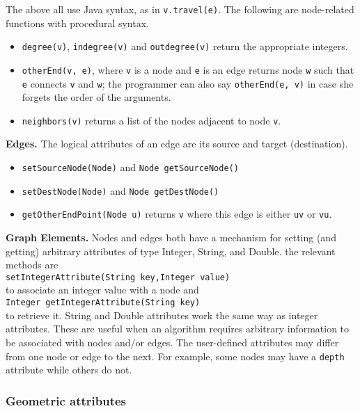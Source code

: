 The above all use Java syntax, as in \texttt{v.travel(e)}.
The following are node-related functions with procedural syntax.

\begin{itemize}
\item \texttt{degree(v)}, \texttt{indegree(v)} and \texttt{outdegree(v)} return the appropriate
integers.
\item \texttt{otherEnd(v, e)}, where \texttt{v} is a node and \texttt{e} is an edge
returns node \texttt{w} such that \texttt{e} connects \texttt{v} and \texttt{w};
the programmer can also say \texttt{otherEnd(e, v)} in case she forgets the order
of the arguments.
\item \texttt{neighbors(v)} returns a list of the nodes adjacent to node \texttt{v}.
\end{itemize}

\bigskip
\textbf{Edges.}
The logical attributes of an edge are its source and target (destination).

\begin{itemize}
\item
\texttt{setSourceNode(Node)} and \texttt{Node~getSourceNode()}
\item
\texttt{setDestNode(Node)} and \texttt{Node~getDestNode()}
\item
\texttt{getOtherEndPoint(Node~u)} returns \texttt{v} where this edge is
either \texttt{uv} or \texttt{vu}.
\end{itemize}

\bigskip
\textbf{Graph Elements.}
Nodes and edges both have a mechanism for setting (and getting)
arbitrary attributes of type Integer, String, and Double.
the relevant methods are\\
\texttt{setIntegerAttribute(String~key,Integer~value)}\\ 
to associate an integer value with a node and\\
\texttt{Integer~getIntegerAttribute(String~key)}\\
to retrieve it.
String and Double attributes work the same way as integer attributes.
These are useful when an algorithm requires arbitrary information to be
associated with nodes and/or edges.
The user-defined attributes may differ from one node or edge to the next.
For example, some nodes may have a \texttt{depth} attribute while others do not.

\subsubsection{Geometric attributes}

